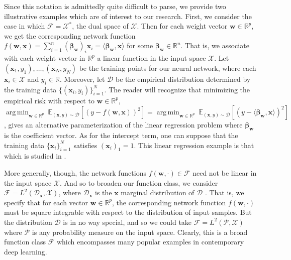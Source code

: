 \documentclass{article}
\DeclareMathOperator*{\argmin}{arg\,min}
\begin{document}
Since this notation is admittedly quite difficult to parse, we provide two illustrative examples which are of interest to our research. First, we consider the case in which $\mathcal{F} = \mathcal{X}^*$, the dual space of $\mathcal{X}$. Then for each weight vector $\boldsymbol{w} \in \mathbb{R}^p$, we get the corresponding network function $f(\boldsymbol{w}, \boldsymbol{x}) = \sum_{i=1}^n (\boldsymbol{\beta}_{\boldsymbol{w}})_i\boldsymbol{x}_i = \langle \boldsymbol{\beta}_{\boldsymbol{w}}, \boldsymbol{x} \rangle$ for some $\boldsymbol{\beta}_{\boldsymbol{w}} \in \mathbb{R}^n$. That is, we associate with each weight vector in $\mathbb{R}^p$ a linear function in the input space $\mathcal{X}$. Let $(\boldsymbol{x}_1, y_1), \ldots, (\boldsymbol{x}_N, y_N)$ be the training points for our neural network, where each $\boldsymbol{x}_i \in \mathcal{X}$ and $y_i \in \mathbb{R}$. Moreover, let $\mathcal{D}$ be the empirical distribution determined by the training data $\{(\boldsymbol{x}_i, y_i) \}_{i=1}^N$. The reader will recognize that minimizing the empirical risk with respect to $\boldsymbol{w} \in \mathbb{R}^p$, $\argmin_{\boldsymbol{w} \in \mathbb{R}^p} \  \mathbb{E}_{(\boldsymbol{x}, y) \sim \mathcal{D}}\left[\left(y - f(\boldsymbol{w}, \boldsymbol{x}) \right)^2 \right] = \argmin_{\boldsymbol{w} \in \mathbb{R}^p} \ \mathbb{E}_{(\boldsymbol{x}, y) \sim \mathcal{D}}\left[\left(y - \langle \boldsymbol{\beta}_{\boldsymbol{w}}, \boldsymbol{x} \rangle \right)^2 \right]$, gives an alternative parameterization of the linear regression problem where $\boldsymbol{\beta}_{\boldsymbol{w}}$ is the coefficient vector. As for the intercept term, one can suppose that the training data $\{ \boldsymbol{x}_i \}_{i=1}^N$ satisfies $(\boldsymbol{x}_i)_1 = 1$. This linear regression example is that which is studied in \cite{woodworth2020kernel}. 

More generally, though, the network functions $f(\boldsymbol{w}, \cdot) \in \mathcal{F}$ need not be linear in the input space $\mathcal{X}$. And so to broaden our function class, we consider $\mathcal{F} = L^2(\mathcal{D}_{\boldsymbol{x}}, \mathcal{X})$, where $\mathcal{D}_{\boldsymbol{x}}$ is the $\boldsymbol{x}$ marginal distribution of $\mathcal{D}$ \cite{chizat2018lazy}. That is, we specify that for each vector $\boldsymbol{w} \in \mathbb{R}^p$, the corresponding network function $f(\boldsymbol{w}, \cdot)$ must be square integrable with respect to the distribution of input samples. But the distribution $\mathcal{D}$ is in no way special, and so we could take $\mathcal{F} = L^2(\mathcal{P}, \mathcal{X})$ where $\mathcal{P}$ is any probability measure on the input space. Clearly, this is a broad function class $\mathcal{F}$ which encompasses many popular examples in contemporary deep learning.
\end{document}
